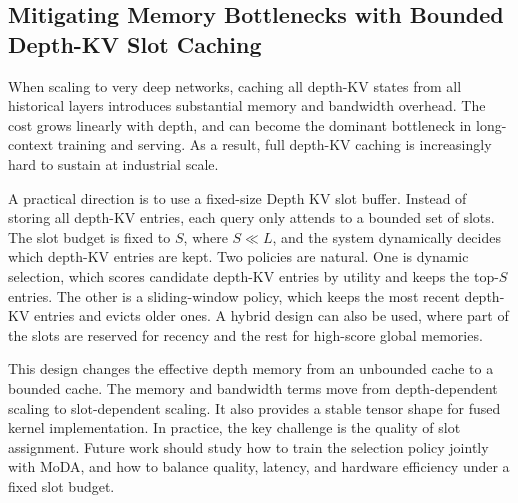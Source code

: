 \documentclass[]{bytedance_seed}
\newcommand{\name}{MoDA}
\begin{document}
\subsection{Mitigating Memory Bottlenecks with Bounded Depth-KV Slot Caching
}
When scaling to very deep networks, caching all depth-KV states from all historical layers introduces substantial memory and bandwidth overhead.
The cost grows linearly with depth, and can become the dominant bottleneck in long-context training and serving.
As a result, full depth-KV caching is increasingly hard to sustain at industrial scale.

A practical direction is to use a fixed-size Depth KV slot buffer.
Instead of storing all depth-KV entries, each query only attends to a bounded set of slots.
The slot budget is fixed to $S$, where $S \ll L$, and the system dynamically decides which depth-KV entries are kept.
Two policies are natural.
One is dynamic selection, which scores candidate depth-KV entries by utility and keeps the top-$S$ entries.
The other is a sliding-window policy, which keeps the most recent depth-KV entries and evicts older ones.
A hybrid design can also be used, where part of the slots are reserved for recency and the rest for high-score global memories.

This design changes the effective depth memory from an unbounded cache to a bounded cache.
The memory and bandwidth terms move from depth-dependent scaling to slot-dependent scaling.
It also provides a stable tensor shape for fused kernel implementation.
In practice, the key challenge is the quality of slot assignment.
Future work should study how to train the selection policy jointly with \name{}, and how to balance quality, latency, and hardware efficiency under a fixed slot budget.





\end{document}
